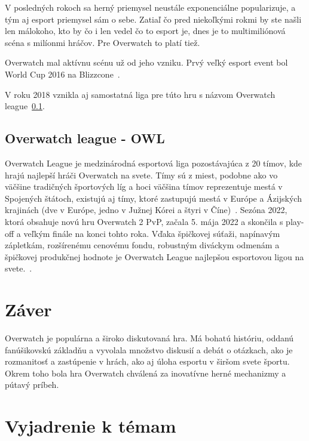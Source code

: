 \documentclass[10pt,oneside,slovak,a4paper]{article}
\begin{document}
V posledných rokoch sa herný priemysel neustále exponenciálne popularizuje, a tým aj esport priemysel sám o sebe. Zatiaľ čo pred niekoľkými rokmi by ste 
našli len málokoho, kto by čo i len vedel čo to esport je, dnes je to multimiliónová scéna s milíonmi hráčov. Pre Overwatch to platí tiež.

Overwatch mal aktívnu scénu už od jeho vzniku. Prvý veľký esport event bol World Cup 2016 na Blizzcone~\cite{Overwatchesport}.

V roku 2018 vznikla aj samostatná liga pre túto hru s názvom Overwatch league~\ref{Overwatch league - OWL}.

\subsection{Overwatch league - OWL} \label{Overwatch league - OWL}

Overwatch League je medzinárodná esportová liga pozostávajúca z 20 tímov, kde hrajú najlepší hráči Overwatch na svete. Tímy sú z miest, podobne ako vo väčšine tradičných športových líg a hoci väčšina tímov reprezentuje mestá v Spojených štátoch, existujú aj tímy, ktoré zastupujú mestá v Európe a Ázijských krajinách (dve v Európe, jedno v Južnej Kórei a štyri v Číne)~\cite{Overwatchesport}. Sezóna 2022, ktorá obsahuje novú hru Overwatch 2 PvP, začala 5. mája 2022 a skončila s play-off a veľkým finále na konci tohto roka. Vďaka špičkovej súťaži, napínavým zápletkám, rozšírenému cenovému fondu, robustným diváckym odmenám a špičkovej produkčnej hodnote je Overwatch League najlepšou esportovou ligou na svete.~\cite{Overwatchsite}.



\section{Záver} \label{Záver}


Overwatch je populárna a široko diskutovaná hra. Má bohatú históriu, oddanú fanúšikovskú základňu a vyvolala množstvo diskusií a debát o otázkach, ako je rozmanitosť a zastúpenie v hrách, ako aj úloha esportu v širšom svete športu. Okrem toho bola hra Overwatch chválená za inovatívne herné mechanizmy a pútavý príbeh.


\section{Vyjadrenie k témam} \label{Vyjadrenie k témam} %
\end{document}
